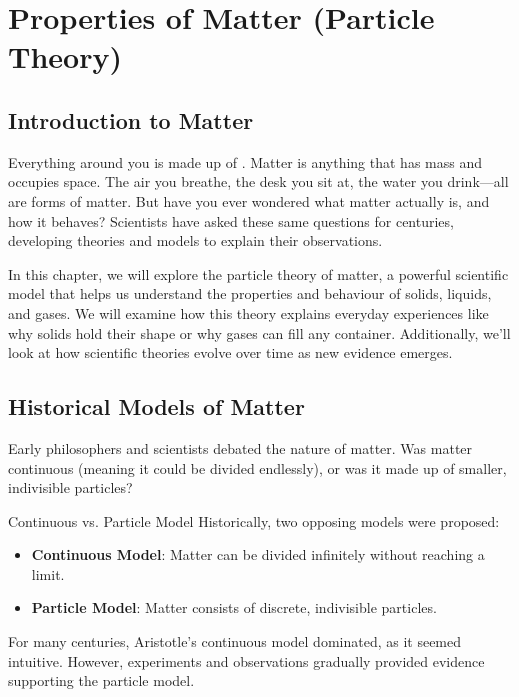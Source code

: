 \chapter{Properties of Matter (Particle Theory)}

\section{Introduction to Matter}

Everything around you is made up of . Matter is anything that has mass and occupies space. The air you breathe, the desk you sit at, the water you drink—all are forms of matter. But have you ever wondered what matter actually is, and how it behaves? Scientists have asked these same questions for centuries, developing theories and models to explain their observations.

In this chapter, we will explore the particle theory of matter, a powerful scientific model that helps us understand the properties and behaviour of solids, liquids, and gases. We will examine how this theory explains everyday experiences like why solids hold their shape or why gases can fill any container. Additionally, we'll look at how scientific theories evolve over time as new evidence emerges.

\section{Historical Models of Matter}

Early philosophers and scientists debated the nature of matter. Was matter continuous (meaning it could be divided endlessly), or was it made up of smaller, indivisible particles?

\begin{keyconcept}{Continuous vs. Particle Model}
Historically, two opposing models were proposed:
\begin{itemize}
    \item \textbf{Continuous Model}: Matter can be divided infinitely without reaching a limit.
    \item \textbf{Particle Model}: Matter consists of discrete, indivisible particles.
\end{itemize}
\end{keyconcept}

For many centuries, Aristotle's continuous model dominated, as it seemed intuitive. However, experiments and observations gradually provided evidence supporting the particle model.

